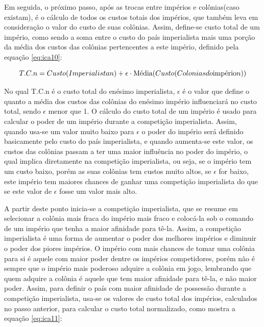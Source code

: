 Em seguida, o próximo passo, após as trocas entre impérios e colônias(caso existam), é o cálculo de todos os custos totais dos impérios, que também leva em consideração o valor do custo de suas colônias. Assim, define-se custo total de um império, como sendo a soma entre o custo do país imperialista mais uma porção da média dos custos das colônias pertencentes a este império, definido pela equação \ref{eq:ica10}:

\begin{equation}
\label{eq:ica10}
T.C.n =   Custo(Imperialista n) + \\
 \epsilon \cdot \text{Média}(Custo(Colonias do \text{império} n))
\end{equation}

No qual T.C.n é o custo total do enésimo imperialista, \(\epsilon\)  é o valor que define o quanto a média dos custos das colônias do enésimo império influenciará no custo total, sendo \(\epsilon\) menor que 1. O cálculo do custo total de um império é usado para calcular o poder de um império durante a competição imperialista. Assim, quando usa-se um valor muito baixo para \(\epsilon\) o poder do império será definido basicamente pelo custo do país imperialista, e quando aumenta-se este valor, os custos das colônias passam a ter uma maior influência no poder do império, o qual implica diretamente na competição imperialista, ou seja, se o império tem um custo baixo, porém as suas colônias tem custos muito altos, se \(\epsilon\) for baixo, este império tem maiores chances de ganhar uma competição imperialista do que se este valor de \(\epsilon\) fosse um valor mais alto.

A partir deste ponto inicia-se a competição imperialista, que se resume em selecionar a colônia mais fraca do império mais fraco e colocá-la sob o comando de um império que tenha a maior afinidade para tê-la. Assim, a competição imperialista é uma forma de aumentar o poder dos melhores impérios e diminuir o poder dos piores impérios. O império com mais chances de tomar uma colônia para si é aquele com maior poder dentre os impérios competidores, porém não é sempre que o império mais poderoso adquire a colônia em jogo, lembrando que quem adquire a colônia é aquele que tem maior afinidade para tê-la, e não maior poder. Assim, para definir o país com maior afinidade de possessão durante a competição imperialista, usa-se os valores de custo total dos impérios, calculados no passo anterior, para calcular o custo total normalizado, como mostra a equação \ref{eq:ica11}:


